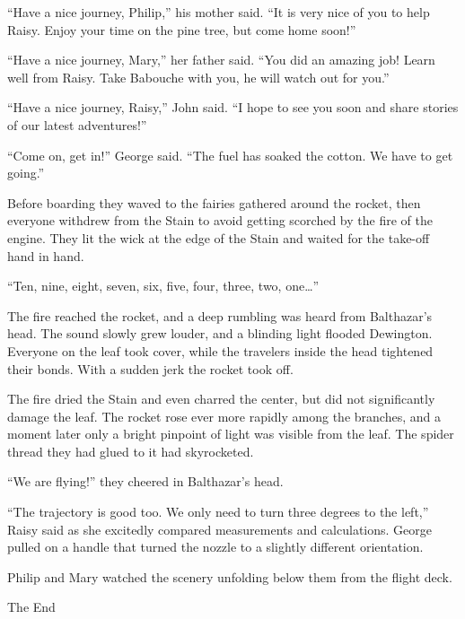 \documentclass[10pt, draft]{memoir}
\begin{document}
``Have a nice journey, Philip,'' his mother said. ``It is very nice of you to help Raisy. Enjoy your time on the pine tree, but come home soon!''

``Have a nice journey, Mary,'' her father said. ``You did an amazing job! Learn well from Raisy. Take Babouche with you, he will watch out for you.''

``Have a nice journey, Raisy,'' John said. ``I hope to see you soon and share stories of our latest adventures!''

``Come on, get in!'' George said. ``The fuel has soaked the cotton. We have to get going.''

Before boarding they waved to the fairies gathered around the rocket, then everyone withdrew from the Stain to avoid getting scorched by the fire of the engine. They lit the wick at the edge of the Stain and waited for the take-off hand in hand.

``Ten, nine, eight, seven, six, five, four, three, two, one\dots''

The fire reached the rocket, and a deep rumbling was heard from Balthazar's head. The sound slowly grew louder, and a blinding light flooded Dewington. Everyone on the leaf took cover, while the travelers inside the head tightened their bonds. With a sudden jerk the rocket took off.

The fire dried the Stain and even charred the center, but did not significantly damage the leaf. The rocket rose ever more rapidly among the branches, and a moment later only a bright pinpoint of light was visible from the leaf. The spider thread they had glued to it had skyrocketed.

``We are flying!'' they cheered in Balthazar's head.

``The trajectory is good too. We only need to turn three degrees to the left,'' Raisy said as she excitedly compared measurements and calculations. George pulled on a handle that turned the nozzle to a slightly different orientation.

Philip and Mary watched the scenery unfolding below them from the flight deck.

\begin{center}
The End
\end{center}%
\end{document}

